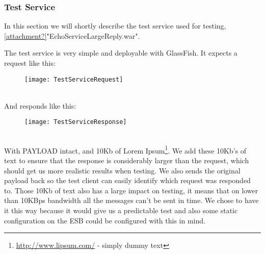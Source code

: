 \subsubsection{Test Service}\label{Testing:About:Service}
    In this section we will shortly describe the test service used for testing, \ref{attachment?}"EchoServiceLargeReply.war".

    The test service is very simple and deployable with GlassFish. It expects a request like this:
    \begin{figure}[h]
        \centering
        \texttt{[image: TestServiceRequest]}
        \label{fig:TestServiceRequest}
    \end{figure}
    \\
    And responds like this:
    \begin{figure}[h]
        \centering
        \texttt{[image: TestServiceResponse]}
        \label{fig:TestServiceResponse}
    \end{figure}
    \\
    With PAYLOAD intact, and 10Kb of Lorem Ipsum\footnote{\url{http://www.lipsum.com/} - simply dummy text}. We add these 10Kb's of text to ensure that the response is considerably larger than the request, which should get us more realistic results when testing. We also sends the original payload back so the test client can easily identify which request was responded to. Those 10Kb of text also has a large impact on testing, it means that on lower than 10KBps bandwidth all the messages can't be sent in time. We chose to have it this way because it would give us a predictable test and also some static configuration on the ESB could be configured with this in mind.
